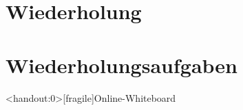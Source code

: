 \section{Wiederholung}





\section{Wiederholungsaufgaben}










\appendix

\begin{frame}<handout:0>[fragile]{Online-Whiteboard}
    \phantom{text}
\end{frame}


